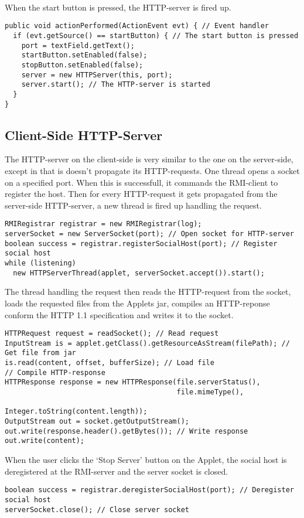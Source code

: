 \documentclass[a4paper, 10pt]{article}
\begin{document}
~\\
\\
\\
When the start button is pressed, the HTTP-server is fired up.
\begin{lstlisting}
public void actionPerformed(ActionEvent evt) { // Event handler
  if (evt.getSource() == startButton) { // The start button is pressed
    port = textField.getText();
    startButton.setEnabled(false);
    stopButton.setEnabled(false);
    server = new HTTPServer(this, port);
    server.start(); // The HTTP-server is started
  }
}
\end{lstlisting}

\subsection{Client-Side HTTP-Server}
The HTTP-server on the client-side is very similar to the one on the server-side, except in that is doesn't propagate its HTTP-requests. One thread opens a socket on a specified port. When this is successfull, it commands the RMI-client to register the host. Then for every HTTP-request it gets propagated from the server-side HTTP-server, a new thread is fired up handling the request.
\begin{lstlisting}
RMIRegistrar registrar = new RMIRegistrar(log);
serverSocket = new ServerSocket(port); // Open socket for HTTP-server
boolean success = registrar.registerSocialHost(port); // Register social host
while (listening)
  new HTTPServerThread(applet, serverSocket.accept()).start();
\end{lstlisting}
The thread handling the request then reads the HTTP-request from the socket, loads the requested files from the Applets jar, compiles an HTTP-reponse conform the HTTP 1.1 specification and writes it to the socket.
\begin{lstlisting}
HTTPRequest request = readSocket(); // Read request
InputStream is = applet.getClass().getResourceAsStream(filePath); // Get file from jar
is.read(content, offset, bufferSize); // Load file
// Compile HTTP-response
HTTPResponse response = new HTTPResponse(file.serverStatus(), 
                                         file.mimeType(), 
                                         Integer.toString(content.length));
OutputStream out = socket.getOutputStream();
out.write(response.header().getBytes()); // Write response
out.write(content);
\end{lstlisting}
When the user clicks the `Stop Server' button on the Applet, the social host is deregistered at the RMI-server and the server socket is closed.
\begin{lstlisting}
boolean success = registrar.deregisterSocialHost(port); // Deregister social host
serverSocket.close(); // Close server socket
\end{lstlisting}
\end{document}
